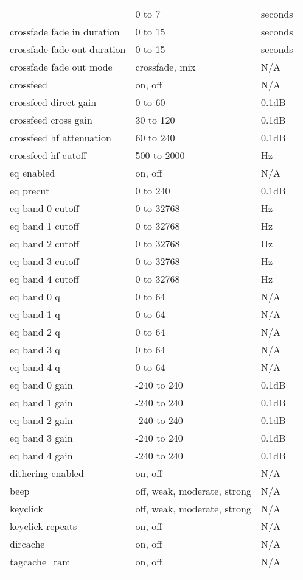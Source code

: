 \begin{center}
\begin{longtable}{@{}>{\raggedright}p{}@{}>{\raggedright}p{}@{}p{}@{}}
{      crossfade fade out delay
                    & 0 to 7            & seconds\\
      crossfade fade in duration
                    & 0 to 15           & seconds\\
      crossfade fade out duration
                    & 0 to 15           & seconds\\
      crossfade fade out mode
                    & crossfade, mix    & N/A\\
%
      crossfeed     & on, off           & N/A\\
      crossfeed direct gain
                    & 0 to 60           & 0.1dB\\
      crossfeed cross gain
                    & 30 to 120         & 0.1dB\\
      crossfeed hf attenuation
                    & 60 to 240         & 0.1dB\\
      crossfeed hf cutoff
                    & 500 to 2000       & Hz\\
%
      eq enabled    & on, off           & N/A\\
      eq precut     & 0 to 240          & 0.1dB\\
      eq band 0 cutoff & 0 to 32768     & Hz\\
      eq band 1 cutoff & 0 to 32768     & Hz\\
      eq band 2 cutoff & 0 to 32768     & Hz\\
      eq band 3 cutoff & 0 to 32768     & Hz\\
      eq band 4 cutoff & 0 to 32768     & Hz\\
      eq band 0 q   & 0 to 64           & N/A\\
      eq band 1 q   & 0 to 64           & N/A\\
      eq band 2 q   & 0 to 64           & N/A\\
      eq band 3 q   & 0 to 64           & N/A\\
      eq band 4 q   & 0 to 64           & N/A\\
      eq band 0 gain & -240 to 240      & 0.1dB\\
      eq band 1 gain & -240 to 240      & 0.1dB\\
      eq band 2 gain & -240 to 240      & 0.1dB\\
      eq band 3 gain & -240 to 240      & 0.1dB\\
      eq band 4 gain & -240 to 240      & 0.1dB\\
%
      dithering enabled & on, off       & N/A\\
      beep          & off, weak, moderate, strong & N/A\\
      keyclick      & off, weak, moderate, strong & N/A\\
      keyclick repeats & on, off        & N/A\\
      dircache      & on, off           & N/A\\
      tagcache\_ram & on, off           & N/A\\
    }%


\end{longtable}
\end{center}
